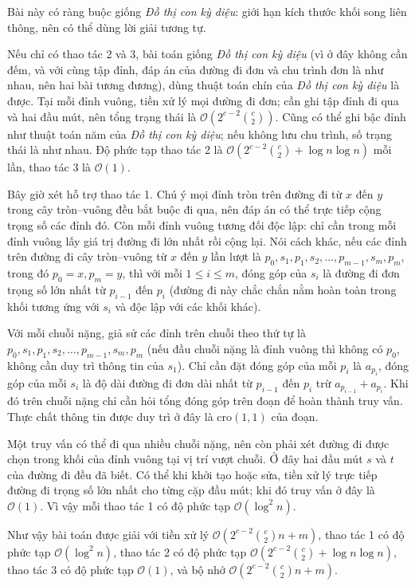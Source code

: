 \documentclass[11pt]{article}
\newcommand{\Oh}{\mathcal{O}}
\begin{document}
Bài này có ràng buộc giống \emph{Đồ thị con kỳ diệu}: giới hạn kích thước khối
song liên thông, nên có thể dùng lời giải tương tự.

Nếu chỉ có thao tác 2 và 3, bài toán giống \emph{Đồ thị con kỳ diệu} (vì ở đây
không cần đếm, và với cùng tập đỉnh, đáp án của đường đi đơn và chu trình đơn
là như nhau, nên hai bài tương đương), dùng thuật toán chín của
\emph{Đồ thị con kỳ diệu} là được. Tại mỗi đỉnh vuông, tiền xử lý mọi đường đi
đơn; cần ghi tập đỉnh đi qua và hai đầu mút, nên tổng trạng thái là
\(\Oh(2^{c-2}\binom{c}{2})\). Cũng có thể ghi bậc đỉnh như thuật toán năm của
\emph{Đồ thị con kỳ diệu}; nếu không lưu chu trình, số trạng thái là như nhau.
Độ phức tạp thao tác 2 là
\(\Oh(2^{c-2}\binom{c}{2}+\log n\log n)\) mỗi lần, thao tác 3 là \(\Oh(1)\).

Bây giờ xét hỗ trợ thao tác 1. Chú ý mọi đỉnh tròn trên đường đi từ \(x\) đến
\(y\) trong cây tròn--vuông đều bắt buộc đi qua, nên đáp án có thể trực tiếp
cộng trọng số các đỉnh đó. Còn mỗi đỉnh vuông tương đối độc lập: chỉ cần trong
mỗi đỉnh vuông lấy giá trị đường đi lớn nhất rồi cộng lại. Nói cách khác, nếu
các đỉnh trên đường đi cây tròn--vuông từ \(x\) đến \(y\) lần lượt là
\(p_0,s_1,p_1,s_2,\ldots,p_{m-1},s_m,p_m\), trong đó \(p_0=x,p_m=y\), thì với
mỗi \(1\le i\le m\), đóng góp của \(s_i\) là đường đi đơn trọng số lớn nhất từ
\(p_{i-1}\) đến \(p_i\) (đường đi này chắc chắn nằm hoàn toàn trong khối tương
ứng với \(s_i\) và độc lập với các khối khác).

Với mỗi chuỗi nặng, giả sử các đỉnh trên chuỗi theo thứ tự là
\(p_0,s_1,p_1,s_2,\ldots,p_{m-1},s_m,p_m\) (nếu đầu chuỗi nặng là đỉnh vuông
thì không có \(p_0\), không cần duy trì thông tin của \(s_1\)). Chỉ cần đặt
đóng góp của mỗi \(p_i\) là \(a_{p_i}\), đóng góp của mỗi \(s_i\) là độ dài
đường đi đơn dài nhất từ \(p_{i-1}\) đến \(p_i\) trừ \(a_{p_{i-1}}+a_{p_i}\).
Khi đó trên chuỗi nặng chỉ cần hỏi tổng đóng góp trên đoạn để hoàn thành truy
vấn. Thực chất thông tin được duy trì ở đây là \(\mathrm{cro}(1,1)\) của đoạn.

Một truy vấn có thể đi qua nhiều chuỗi nặng, nên còn phải xét đường đi được
chọn trong khối của đỉnh vuông tại vị trí vượt chuỗi. Ở đây hai đầu mút \(s\)
và \(t\) của đường đi đều đã biết. Có thể khi khởi tạo hoặc sửa, tiền xử lý
trực tiếp đường đi trọng số lớn nhất cho từng cặp đầu mút; khi đó truy vấn ở
đây là \(\Oh(1)\). Vì vậy mỗi thao tác 1 có độ phức tạp \(\Oh(\log^2 n)\).

Như vậy bài toán được giải với tiền xử lý
\(\Oh(2^{c-2}\binom{c}{2}n+m)\), thao tác 1 có độ phức tạp \(\Oh(\log^2 n)\),
thao tác 2 có độ phức tạp
\(\Oh(2^{c-2}\binom{c}{2}+\log n\log n)\), thao tác 3 có độ phức tạp
\(\Oh(1)\), và bộ nhớ \(\Oh(2^{c-2}\binom{c}{2}n+m)\).
\end{document}
